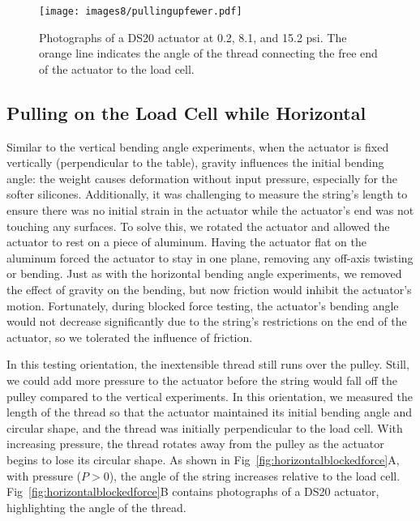 \begin{figure}[ht]
    \centering
     \texttt{[image: images8/pullingupfewer.pdf]}
    \caption{Photographs of a DS20 actuator at 0.2, 8.1, and 15.2 psi. The orange line indicates the angle of the thread connecting the free end of the actuator to the load cell.}
    \label{fig:verticalstringanglefewer}
\end{figure}

\clearpage
\subsection{Pulling on the Load Cell while Horizontal}

Similar to the vertical bending angle experiments, when the actuator is fixed vertically (perpendicular to the table), gravity influences the initial bending angle: the weight causes deformation without input pressure, especially for the softer silicones. Additionally, it was challenging to measure the string's length to ensure there was no initial strain in the actuator while the actuator's end was not touching any surfaces. To solve this, we rotated the actuator and allowed the actuator to rest on a piece of aluminum. Having the actuator flat on the aluminum forced the actuator to stay in one plane, removing any off-axis twisting or bending. Just as with the horizontal bending angle experiments, we removed the effect of gravity on the bending, but now friction would inhibit the actuator's motion. Fortunately, during blocked force testing, the actuator's bending angle would not decrease significantly due to the string's restrictions on the end of the actuator, so we tolerated the influence of friction. 

In this testing orientation, the inextensible thread still runs over the pulley. Still, we could add more pressure to the actuator before the string would fall off the pulley compared to the vertical experiments. In this orientation, we measured the length of the thread so that the actuator maintained its initial bending angle and circular shape, and the thread was initially perpendicular to the load cell. With increasing pressure, the thread rotates away from the pulley as the actuator begins to lose its circular shape. As shown in Fig~\ref{fig:horizontalblockedforce}A, with pressure ($P > 0$), the angle of the string increases relative to the load cell. Fig~\ref{fig:horizontalblockedforce}B contains photographs of a DS20 actuator, highlighting the angle of the thread. 

